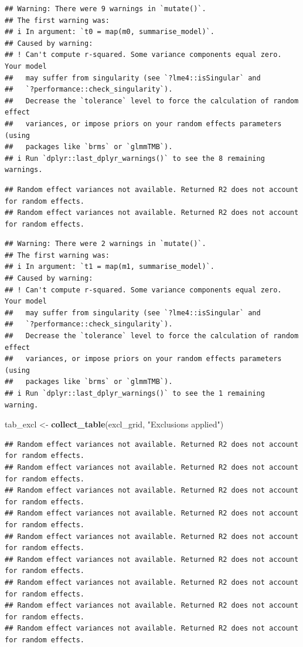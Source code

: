 \documentclass[
  10pt,
]{article}
\newenvironment{Shaded}{\begin{snugshade}}{\end{snugshade}}
\newcommand{\FunctionTok}[1]{\textcolor[rgb]{0.13,0.29,0.53}{\textbf{#1}}}
\newcommand{\NormalTok}[1]{#1}
\newcommand{\OtherTok}[1]{\textcolor[rgb]{0.56,0.35,0.01}{#1}}
\newcommand{\StringTok}[1]{\textcolor[rgb]{0.31,0.60,0.02}{#1}}
\begin{document}
\begin{verbatim}
## Warning: There were 9 warnings in `mutate()`.
## The first warning was:
## i In argument: `t0 = map(m0, summarise_model)`.
## Caused by warning:
## ! Can't compute r-squared. Some variance components equal zero. Your model
##   may suffer from singularity (see `?lme4::isSingular` and
##   `?performance::check_singularity`).
##   Decrease the `tolerance` level to force the calculation of random effect
##   variances, or impose priors on your random effects parameters (using
##   packages like `brms` or `glmmTMB`).
## i Run `dplyr::last_dplyr_warnings()` to see the 8 remaining warnings.
\end{verbatim}

\begin{verbatim}
## Random effect variances not available. Returned R2 does not account for random effects.
## Random effect variances not available. Returned R2 does not account for random effects.
\end{verbatim}

\begin{verbatim}
## Warning: There were 2 warnings in `mutate()`.
## The first warning was:
## i In argument: `t1 = map(m1, summarise_model)`.
## Caused by warning:
## ! Can't compute r-squared. Some variance components equal zero. Your model
##   may suffer from singularity (see `?lme4::isSingular` and
##   `?performance::check_singularity`).
##   Decrease the `tolerance` level to force the calculation of random effect
##   variances, or impose priors on your random effects parameters (using
##   packages like `brms` or `glmmTMB`).
## i Run `dplyr::last_dplyr_warnings()` to see the 1 remaining warning.
\end{verbatim}

\begin{Shaded}
\begin{Highlighting}[]
\NormalTok{tab\_excl }\OtherTok{\textless{}{-}} \FunctionTok{collect\_table}\NormalTok{(excl\_grid, }\StringTok{"Exclusions applied"}\NormalTok{)}
\end{Highlighting}
\end{Shaded}

\begin{verbatim}
## Random effect variances not available. Returned R2 does not account for random effects.
## Random effect variances not available. Returned R2 does not account for random effects.
## Random effect variances not available. Returned R2 does not account for random effects.
## Random effect variances not available. Returned R2 does not account for random effects.
## Random effect variances not available. Returned R2 does not account for random effects.
## Random effect variances not available. Returned R2 does not account for random effects.
## Random effect variances not available. Returned R2 does not account for random effects.
## Random effect variances not available. Returned R2 does not account for random effects.
## Random effect variances not available. Returned R2 does not account for random effects.
\end{verbatim}
\end{document}
